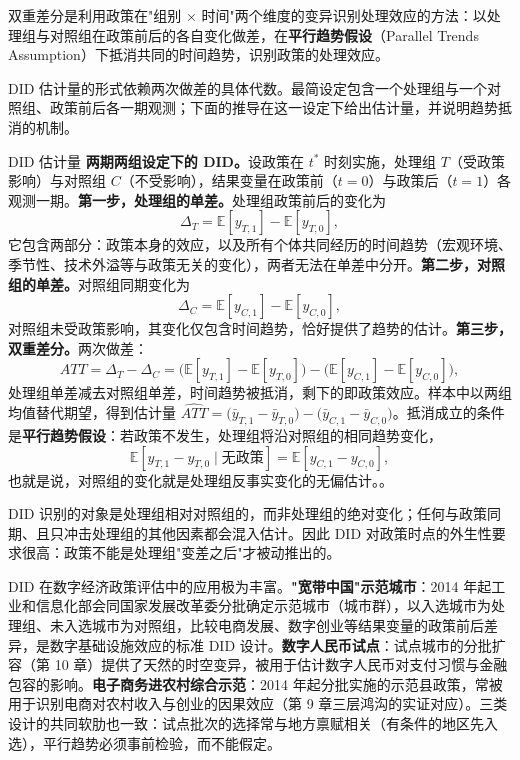 \begin{definition}
双重差分是利用政策在"组别 × 时间"两个维度的变异识别处理效应的方法：以处理组与对照组在政策前后的各自变化做差，在\textbf{平行趋势假设}（Parallel Trends Assumption）下抵消共同的时间趋势，识别政策的处理效应。
\end{definition}

DID 估计量的形式依赖两次做差的具体代数。最简设定包含一个处理组与一个对照组、政策前后各一期观测；下面的推导在这一设定下给出估计量，并说明趋势抵消的机制。

\begin{derivation}{DID 估计量}{}
\textbf{两期两组设定下的 DID。}设政策在 $t^*$ 时刻实施，处理组 $T$（受政策影响）与对照组 $C$（不受影响），结果变量在政策前（$t = 0$）与政策后（$t = 1$）各观测一期。\textbf{第一步，处理组的单差。}处理组政策前后的变化为
\[
\Delta_T = \mathbb{E}[y_{T,1}] - \mathbb{E}[y_{T,0}],
\]
它包含两部分：政策本身的效应，以及所有个体共同经历的时间趋势（宏观环境、季节性、技术外溢等与政策无关的变化），两者无法在单差中分开。\textbf{第二步，对照组的单差。}对照组同期变化为
\[
\Delta_C = \mathbb{E}[y_{C,1}] - \mathbb{E}[y_{C,0}],
\]
对照组未受政策影响，其变化仅包含时间趋势，恰好提供了趋势的估计。\textbf{第三步，双重差分。}两次做差：
\[
ATT = \Delta_T - \Delta_C
= \bigl(\mathbb{E}[y_{T,1}] - \mathbb{E}[y_{T,0}]\bigr) - \bigl(\mathbb{E}[y_{C,1}] - \mathbb{E}[y_{C,0}]\bigr),
\]
处理组单差减去对照组单差，时间趋势被抵消，剩下的即政策效应。样本中以两组均值替代期望，得到估计量 $\hat{ATT} = \bigl(\bar y_{T,1} - \bar y_{T,0}\bigr) - \bigl(\bar y_{C,1} - \bar y_{C,0}\bigr)$。抵消成立的条件是\textbf{平行趋势假设}：若政策不发生，处理组将沿对照组的相同趋势变化，
\[
\mathbb{E}[y_{T,1} - y_{T,0} \mid \text{无政策}] = \mathbb{E}[y_{C,1} - y_{C,0}],
\]
也就是说，对照组的变化就是处理组反事实变化的无偏估计。。
\end{derivation}

DID 识别的对象是处理组相对对照组的，而非处理组的绝对变化；任何与政策同期、且只冲击处理组的其他因素都会混入估计。因此 DID 对政策时点的外生性要求很高：政策不能是处理组"变差之后"才被动推出的。

DID 在数字经济政策评估中的应用极为丰富。\textbf{"宽带中国"示范城市}：2014 年起工业和信息化部会同国家发展改革委分批确定示范城市（城市群），以入选城市为处理组、未入选城市为对照组，比较电商发展、数字创业等结果变量的政策前后差异，是数字基础设施效应的标准 DID 设计。\textbf{数字人民币试点}：试点城市的分批扩容（第 10 章）提供了天然的时空变异，被用于估计数字人民币对支付习惯与金融包容的影响。\textbf{电子商务进农村综合示范}：2014 年起分批实施的示范县政策，常被用于识别电商对农村收入与创业的因果效应（第 9 章三层鸿沟的实证对应）。三类设计的共同软肋也一致：试点批次的选择常与地方禀赋相关（有条件的地区先入选），平行趋势必须事前检验，而不能假定。

